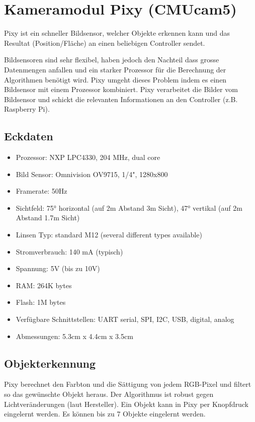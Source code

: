 \section{Kameramodul Pixy (CMUcam5)}
\label{anhang-pixy}
Pixy ist ein schneller Bildsensor, welcher Objekte erkennen kann und das Resultat (Position/Fläche) an einen beliebigen Controller sendet.

Bildsensoren sind sehr flexibel, haben jedoch den Nachteil dass grosse Datenmengen anfallen und ein starker Prozessor für die Berechnung der Algorithmen benötigt wird. Pixy umgeht dieses Problem indem es einen Bildsensor mit einem Prozessor kombiniert. Pixy verarbeitet die Bilder vom Bildsensor und schickt die relevanten Informationen an den Controller (z.B. Raspberry Pi).

\subsection{Eckdaten}

\begin{itemize}
	\item Prozessor: NXP LPC4330, 204 MHz, dual core
	\item Bild Sensor: Omnivision OV9715, 1/4", 1280x800
	\item Framerate: 50Hz
	\item Sichtfeld: 75° horizontal (auf 2m Abstand 3m Sicht), 47° vertikal (auf 2m Abstand 1.7m Sicht)
	\item Linsen Typ: standard M12 (several different types available)
	\item Stromverbrauch: 140 mA (typisch)
	\item Spannung: 5V (bis zu 10V)
	\item RAM: 264K bytes
	\item Flash: 1M bytes
	\item Verfügbare Schnittstellen: UART serial, SPI, I2C, USB, digital, analog
	\item Abmessungen: 5.3cm x 4.4cm x 3.5cm
\end{itemize}

\subsection{Objekterkennung}

Pixy berechnet den Farbton und die Sättigung von jedem RGB-Pixel und filtert so das gewünschte Objekt heraus. Der Algorithmus ist robust gegen Lichtveränderungen (laut Hersteller). Ein Objekt kann in Pixy per Knopfdruck eingelernt werden. Es können bis zu 7 Objekte eingelernt werden.

